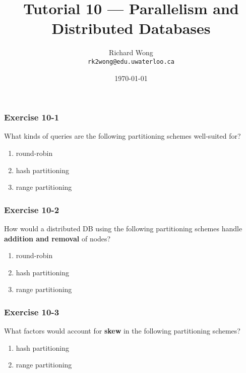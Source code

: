 

\def\ojoin{\setbox0=\hbox{$\bowtie$}%
  \rule[-.02ex]{.25em}{.4pt}\llap{\rule[\ht0]{.25em}{.4pt}}}
\def\leftouterjoin{\mathbin{\ojoin\mkern-5.8mu\bowtie}}

\title{Tutorial 10 --- Parallelism and Distributed Databases }

\author{Richard Wong \\ \small \texttt{rk2wong@edu.uwaterloo.ca}}
\date{\today}




\begin{frame}
  \titlepage

\end{frame}


\begin{frame}
\frametitle{Exercise 10-1}

What kinds of queries are the following partitioning schemes well-suited for?

\begin{enumerate}
  \item round-robin
  \item hash partitioning
  \item range partitioning
\end{enumerate}

\end{frame}


\begin{frame}
\frametitle{Exercise 10-2}

How would a distributed DB using the following partitioning schemes handle \textbf{addition and removal} of nodes?

\begin{enumerate}
  \item round-robin
  \item hash partitioning
  \item range partitioning
\end{enumerate}

\end{frame}


\begin{frame}
\frametitle{Exercise 10-3}

What factors would account for \textbf{skew} in the following partitioning schemes?

\begin{enumerate}
  \item hash partitioning
  \item range partitioning
\end{enumerate}

\end{frame}


